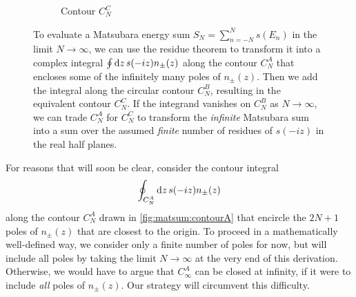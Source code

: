 \begin{figure}
\begin{subfigure}{0.32\textwidth}
\caption{\label{fig:matsum:contourC}Contour $C^C_N$}
\end{subfigure}
\caption{\label{fig:matsum:contours}%
	To evaluate a Matsubara energy sum $S_N = \sum_{n=-N}^N s(E_n)$ in the limit $N \rightarrow \infty$, we can use the residue theorem to transform it into a complex integral $\oint \mathop{}\!\mathrm{d} z \, s(-iz) n_\pm(z)$ along the contour $C^A_N$ that encloses some of the infinitely many poles of $n_\pm(z)$.
	Then we add the integral along the circular contour $C_N^B$, resulting in the equivalent contour $C^C_N$.
	If the integrand vanishes on $C_N^B$ as $N \rightarrow \infty$, we can trade $C_N^A$ for $C_N^C$ to transform the \emph{infinite} Matsubara sum into a sum over the assumed \emph{finite} number of residues of $s(-iz)$ in the real half planes.
}
\end{figure}

For reasons that will soon be clear, consider the contour integral
\begin{equation}
	\oint_{C_N^A} \mathop{}\!\mathrm{d} z \, s(-iz) n_\pm(z)
\label{eq:matsum:contour_integral}
\end{equation}
along the contour $C_N^A$ drawn in \cref{fig:matsum:contourA} that encircle the $2N+1$ poles of $n_\pm(z)$ that are closest to the origin.
To proceed in a mathematically well-defined way, we consider only a finite number of poles for now, but will include all poles by taking the limit $N \rightarrow \infty$ at the very end of this derivation.
Otherwise, we would have to argue that $C_\infty^A$ can be closed at infinity, if it were to include \emph{all} poles of $n_\pm(z)$.
Our strategy will circumvent this difficulty.

